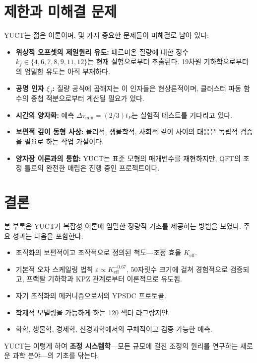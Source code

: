 \documentclass[11pt,a4paper]{article}
\theoremstyle{remark}
\newcommand{\Keff}{K_{\mathrm{eff}}}
\begin{document}
	\section{제한과 미해결 문제}
	\label{sec:limitations}
	
	YUCT는 젊은 이론이며, 몇 가지 중요한 문제들이 미해결로 남아 있다:
	\begin{itemize}
		\item \textbf{위상적 오프셋의 제일원리 유도:} 페르미온 질량에 대한 정수 \(k_f \in \{4,6,7,8,9,11,12\}\)는 현재 실험으로부터 추출된다. 19차원 기하학으로부터의 엄밀한 유도는 아직 부재하다.
		\item \textbf{공명 인자 \(\xi_f\):} 질량 공식에 곱해지는 이 인자들은 현상론적이며, 클러스터 파동 함수의 중첩 적분으로부터 계산될 필요가 있다.
		\item \textbf{시간의 양자화:} 예측 \(\Delta\tau_{\min} = (2/3) t_P\)는 실험적 테스트를 기다리고 있다.
		\item \textbf{보편적 깊이 동형 사상:} 물리적, 생물학적, 사회적 깊이 사이의 대응은 독립적 검증을 필요로 하는 작업 가설이다.
		\item \textbf{양자장 이론과의 통합:} YUCT는 표준 모형의 매개변수를 재현하지만, QFT의 조정 틀로의 완전한 매립은 진행 중인 프로젝트이다.
	\end{itemize}
	
	\section{결론}
	\label{sec:conclusion}
	
	본 부록은 YUCT가 복잡성 이론에 엄밀한 정량적 기초를 제공하는 방법을 보였다. 주요 성과는 다음을 포함한다:
	\begin{itemize}
		\item 조직화의 보편적이고 조작적으로 정의된 척도—조정 효율 \(\Keff\).
		\item 기본적 오차 스케일링 법칙 \(\varepsilon \propto \Keff^{-0.67}\), 50자릿수 크기에 걸쳐 경험적으로 검증되고, 프랙탈 기하학과 KPZ 관계로부터 이론적으로 유도됨.
		\item 자기 조직화의 메커니즘으로서의 YPSDC 프로토콜.
		\item 학제적 모델링을 가능하게 하는 120 섹터 라그랑지안.
		\item 화학, 생물학, 경제학, 신경과학에서의 구체적이고 검증 가능한 예측.
	\end{itemize}
	
	YUCT는 이렇게 하여 \textbf{조정 시스템학}—모든 규모에 걸친 조정의 원리를 연구하는 새로운 과학 분야—의 기초를 닦는다.
	
\end{document}
